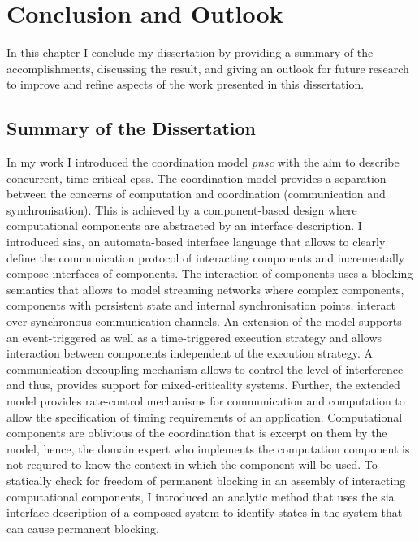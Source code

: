 %
\chapter{Conclusion and Outlook}
\label{chap_conclusion}
In this chapter I conclude my dissertation by providing a summary of the accomplishments, discussing the result, and giving an outlook for future research to improve and refine aspects of the work presented in this dissertation.

\section{Summary of the Dissertation}
\label{sect_conclusion_summary}
In my work I introduced the coordination model \emph{\gls{pnsc}} with the aim to describe concurrent, time-critical \glspl{cps}.
The coordination model provides a separation between the concerns of computation and coordination (\ie communication and synchronisation).
This is achieved by a component-based design where computational components are abstracted by an interface description.
I introduced \glspl{sia}, an automata-based interface language that allows to clearly define the communication protocol of interacting components and incrementally compose interfaces of components.
The interaction of components uses a blocking semantics that allows to model streaming networks where complex components, \ie components with persistent state and internal synchronisation points, interact over synchronous communication channels.
An extension of the model supports an event-triggered as well as a time-triggered execution strategy and allows interaction between components independent of the execution strategy.
A communication decoupling mechanism allows to control the level of interference and thus, provides support for mixed-criticality systems.
Further, the extended model provides rate-control mechanisms for communication and computation to allow the specification of timing requirements of an application.
Computational components are oblivious of the coordination that is excerpt on them by the model, hence, the domain expert who implements the computation component is not required to know the context in which the component will be used.
To statically check for freedom of permanent blocking in an assembly of interacting computational components, I introduced an analytic method that uses the \gls{sia} interface description of a composed system to identify states in the system that can cause permanent blocking.

